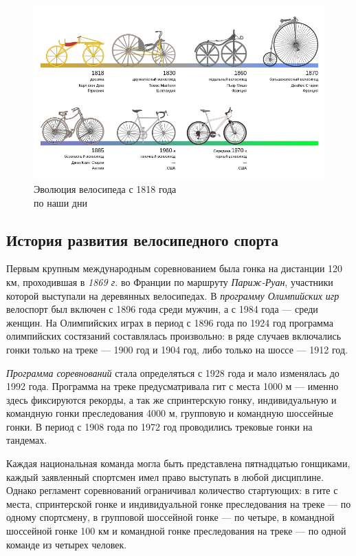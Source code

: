 \begin{figure}[h]
  \centering
  \includegraphics[width=150mm]{pic/bicycle_evolution.png}
  \caption{Эволюция велосипеда с 1818 года \\ по наши дни}
  \label{fig:bicycle_evolution}
\end{figure}


\subsection{История развития велосипедного спорта}

Первым крупным международным соревнованием была гонка на дистанции 120 км,
проходившая в \textit{1869 г.} во Франции по маршруту \textit{Париж-Руан},
участники которой выступали на деревянных велосипедах. В \textit{программу Олимпийских игр}
велоспорт был включен с 1896 года среди мужчин, а с 1984 года --- среди женщин.
На Олимпийских играх в период с 1896 года по 1924 год программа олимпийских
состязаний составлялась произвольно: в ряде случаев включались гонки только
на треке --- 1900 год и 1904 год, либо только на шоссе --- 1912 год.

\textit{Программа соревнований} стала определяться с 1928 года и мало изменялась до 1992 года.
Программа на треке предусматривала гит с места 1000 м --- именно здесь фиксируются рекорды,
а так же спринтерскую гонку, индивидуальную и командную гонки преследования 4000 м,
групповую и командную шоссейные гонки. В период с 1908 года по 1972 год
проводились трековые гонки на тандемах.

Каждая национальная команда могла быть представлена пятнадцатью гонщиками,
каждый заявленный спортсмен имел право
выступать в любой дисциплине. Однако регламент соревнований ограничивал
количество стартующих: в гите с места, спринтерской гонке и индивидуальной
гонке преследования на треке --- по одному спортсмену, в групповой шоссейной гонке --- по четыре,
в командной шоссейной гонке 100 км и командной гонке преследования на треке ---
по одной команде из четырех человек.

